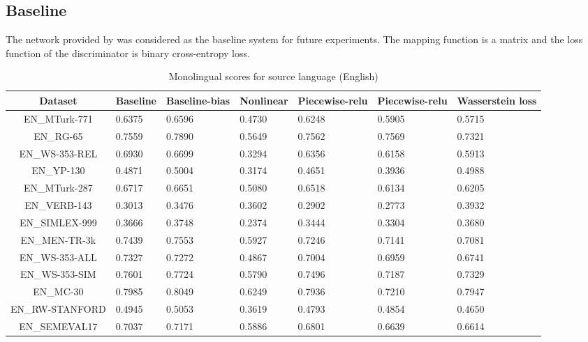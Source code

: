 \documentclass[11pt]{article}
\begin{document}
\subsection{Baseline} \label{baseline}
The network provided by \cite{muserepo} was considered as the baseline system for future experiments. The mapping function is a matrix and the loss function of the discriminator is binary cross-entropy loss.

\begin{table*}[ht]
  \begin{center}
  \begin{tabular}{|c|l|l|l|l|l|l|}
  \hline
  Dataset & Baseline & Baseline-bias & Nonlinear & Piecewise-relu & Piecewise-relu & Wasserstein loss\\
  \hline
  EN\_MTurk-771 & 0.6375 & 0.6596 & 0.4730 & 0.6248 & 0.5905 & 0.5715 \\
  \hline
  EN\_RG-65 & 0.7559 & 0.7890 & 0.5649 & 0.7562 & 0.7569 & 0.7321 \\
  \hline
  EN\_WS-353-REL & 0.6930 & 0.6699 & 0.3294 & 0.6356 & 0.6158 & 0.5913 \\
  \hline
  EN\_YP-130 & 0.4871 & 0.5004 & 0.3174 & 0.4651 & 0.3936 & 0.4988 \\
  \hline
  EN\_MTurk-287 & 0.6717 & 0.6651 & 0.5080 & 0.6518 & 0.6134 & 0.6205 \\
  \hline
  EN\_VERB-143 & 0.3013 & 0.3476 & 0.3602 & 0.2902 & 0.2773 & 0.3932 \\
  \hline
  EN\_SIMLEX-999 & 0.3666 & 0.3748 & 0.2374 & 0.3444 & 0.3304 & 0.3680 \\
  \hline
  EN\_MEN-TR-3k & 0.7439 & 0.7553 & 0.5927 & 0.7246 & 0.7141 & 0.7081 \\
  \hline
  EN\_WS-353-ALL & 0.7327 & 0.7272 & 0.4867 & 0.7004 & 0.6959 & 0.6741 \\
  \hline
  EN\_WS-353-SIM & 0.7601 & 0.7724 & 0.5790 & 0.7496 & 0.7187 & 0.7329 \\
  \hline
  EN\_MC-30 & 0.7985 & 0.8049 & 0.6249 & 0.7936 & 0.7210 & 0.7947 \\
  \hline
  EN\_RW-STANFORD & 0.4945 & 0.5053 & 0.3619 & 0.4793 & 0.4854 & 0.4650 \\
  \hline
  EN\_SEMEVAL17 & 0.7037 & 0.7171 & 0.5886 & 0.6801 & 0.6639 & 0.6614 \\
  \hline
  \end{tabular}
  \end{center}
  \caption{ Monolingual scores for source language (English)}
  \label{monolingual-source}
\end{table*}
\end{document}
